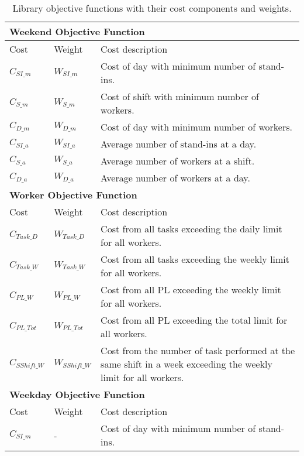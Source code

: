 \begin{table}[!h]
\centering
\caption{Library objective functions with their cost components and weights.}
\label{tab:lib_costs}
\begin{tabular}{|l|l|p{7cm}|}
\hline
\multicolumn{3}{|l|}{\cellcolor{gray!90} \textbf{Weekend Objective Function}} \\
\hline 
\rowcolor{Gray} Cost & Weight & Cost description \\ \hline
$C_{SI\_m}$ & $W_{SI\_m}$ & Cost of day with minimum number of stand-ins. \\ \hline
$C_{S\_m}$ & $W_{S\_m}$ & Cost of shift with minimum number of workers. \\ \hline
$C_{D\_m}$ & $W_{D\_m}$ & Cost of day with minimum number of workers. \\ \hline
$C_{SI\_a}$ & $W_{SI\_a}$ & Average number of stand-ins at a day. \\ \hline
$C_{S\_a}$ & $W_{S\_a}$ & Average number of workers at a shift. \\ \hline
$C_{D\_a}$ & $W_{D\_a}$ & Average number of workers at a day. \\ \hline
\hline
\multicolumn{3}{|l|}{\cellcolor{gray!90} \textbf{Worker Objective Function}} \\
\hline
\rowcolor{Gray} Cost & Weight & Cost description \\ \hline
$C_{Task\_D}$ & $W_{Task\_D}$ & Cost from all tasks exceeding the daily limit for all workers. \\ \hline
$C_{Task\_W}$ & $W_{Task\_W}$ & Cost from all tasks exceeding the weekly limit for all workers. \\ \hline
$C_{PL\_W}$ & $W_{PL\_W}$ & Cost from all PL exceeding the weekly limit for all workers. \\ \hline
$C_{PL\_Tot}$ & $W_{PL\_Tot}$ & Cost from all PL exceeding the total limit for all workers. \\ \hline
$C_{SShift\_W}$ & $W_{SShift\_W}$ & Cost from the number of task performed at the same shift in a week exceeding the weekly limit for all workers. \\ \hline
\hline
 \multicolumn{3}{|l|}{\cellcolor{gray!90} \textbf{Weekday Objective Function}} \\
\hline
\rowcolor{Gray} Cost & Weight & Cost description \\ \hline
$C_{SI\_m}$ & - & Cost of day with minimum number of stand-ins. \\ \hline
\end{tabular}
\end{table}

